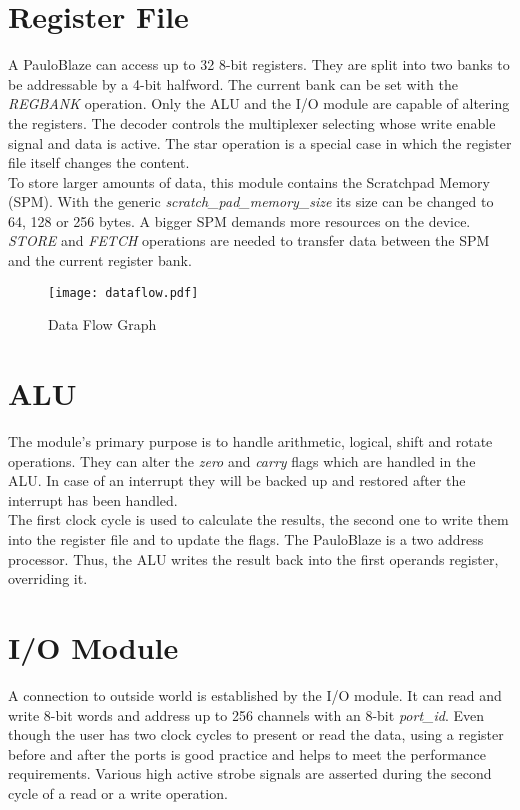 \section{Register File}
\label{sec:reg}
A PauloBlaze can access up to 32 8-bit registers.
They are split into two banks to be addressable by a 4-bit halfword.
The current bank can be set with the \emph{REGBANK} operation.
Only the ALU and the I/O module are capable of altering the registers.
The decoder controls the multiplexer selecting whose write enable signal and data is active.
The star operation is a special case in which the register file itself changes the content.
\\
To store larger amounts of data, this module contains the Scratchpad Memory (SPM).
With the generic \emph{scratch\_pad\_memory\_size} its size can be changed to 64, 128 or 256 bytes.
A bigger SPM demands more resources on the device.
\emph{STORE} and \emph{FETCH} operations are needed to transfer data between the SPM and the current register bank.

\begin{figure}[h]
	\sffamily
\centering
\texttt{[image: dataflow.pdf]}
\caption{Data Flow Graph}
\label{fig:dataflow}
\end{figure}

\section{ALU}
\label{sec:alu}
The module's primary purpose is to handle arithmetic, logical, shift and rotate operations.
They can alter the \emph{zero} and \emph{carry} flags which are handled in the ALU.
In case of an interrupt they will be backed up and restored after the interrupt has been handled.
\\
The first clock cycle is used to calculate the results, the second one to write them into the register file and to update the flags.
The PauloBlaze is a two address processor.
Thus, the ALU writes the result back into the first operands register, overriding it.

\section{I/O Module}
\label{sec:io}
A connection to outside world is established by the I/O module.
It can read and write 8-bit words and address up to 256 channels with an 8-bit \emph{port\_id}.
Even though the user has two clock cycles to present or read the data, using a register before and after the ports is good practice and helps to meet the performance requirements.
Various high active strobe signals are asserted during the second cycle of a read or a write operation.
